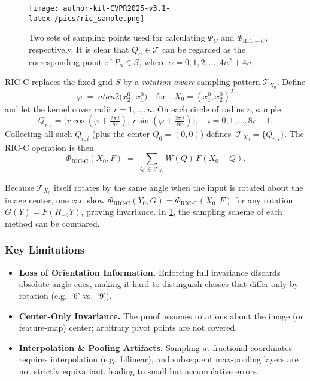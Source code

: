 \begin{figure}
    \centering
    \texttt{[image: author-kit-CVPR2025-v3.1-latex-/pics/ric\_sample.png]}
    \caption{Two sets of sampling points used for calculating $\Phi_C$ and $\Phi_{\mathrm{RIC}-C}$, respectively. It is clear that $Q_\alpha\in\mathcal T$ can be regarded as the corresponding point of $P_\alpha\in\mathcal S$, where $\alpha=0,1,2,\dots,4n^2+4n$.}
    \label{fig:ric_sample}
\end{figure}
RIC-C replaces the fixed grid \(S\) by a \emph{rotation-aware} sampling pattern \(\mathcal T_{X_0}\).  Define
\[
\varphi \;=\;atan2\bigl(x^0_2,\,x^0_1\bigr)
\quad\text{for}\quad
X_0=(x^0_1,x^0_2)^T
\]
and let the kernel cover radii \(r=1,\dots,n\).  On each circle of radius \(r\), sample
\begin{equation}
Q_{r,i}
=
\bigl(r\cos(\varphi + \tfrac{2\pi\,i}{8r}),\,r\sin(\varphi + \tfrac{2\pi\,i}{8r})\bigr),
\quad
i=0,1,\dots,8r-1.
\label{eq:ric_points}
\end{equation}
Collecting all such \(Q_{r,i}\) (plus the center \(Q_{0}=(0,0)\)) defines
\(\;\mathcal T_{X_0}=\{Q_{r,i}\}\).
The RIC-C operation is then
\begin{equation}
\Phi_{\mathrm{RIC\text{-}C}}(X_0, F)
\;=\;
\sum_{Q \,\in\, \mathcal T_{X_0}} W(Q)\,F(X_0 + Q).
\label{eq:ric_conv}
\end{equation}

\noindent
Because \(\mathcal T_{X_0}\) itself rotates by the same angle when the input is rotated about the image center, one can show
\(\Phi_{\mathrm{RIC\text{-}C}}(Y_0,G) = \Phi_{\mathrm{RIC\text{-}C}}(X_0,F)\)
for any rotation \(G(Y) = F(R_{-\theta} Y)\), proving invariance. In \ref{fig:ric_sample}, the sampling scheme of each method can be compared.

\subsubsection*{Key Limitations}

\begin{itemize}
  \item \textbf{Loss of Orientation Information.}  Enforcing full invariance discards absolute angle cues, making it hard to distinguish classes that differ only by rotation (e.g.\ ‘6’ vs.\ ‘9’).  
  \item \textbf{Center-Only Invariance.}  The proof assumes rotations about the image (or feature-map) center; arbitrary pivot points are not covered.  
  \item \textbf{Interpolation \& Pooling Artifacts.}  Sampling at fractional coordinates requires interpolation (e.g.\ bilinear), and subsequent max-pooling layers are not strictly equivariant, leading to small but accumulative errors.
\end{itemize}